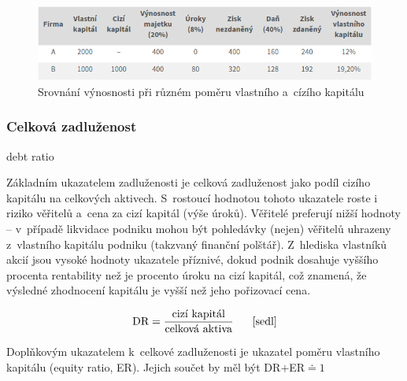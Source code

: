 \begin{figure}
  \centering
  \includegraphics[width=15cm]{img/tab.png}
  \caption{Srovnání výnosnosti při různém poměru vlastního a~cízího kapitálu}
\end{figure}



\subsubsection{Celková zadluženost}
debt ratio

Základním ukazatelem zadluženosti je celková zadluženost jako podíl cizího kapitálu na celkových aktivech. S~rostoucí hodnotou tohoto ukazatele roste i riziko věřitelů a~cena za cizí kapitál (výše úroků). Věřitelé preferují nižší hodnoty -- v~případě likvidace podniku mohou být pohledávky (nejen) věřitelů uhrazeny z~vlastního kapitálu podniku (takzvaný finanční polštář).
Z~hlediska vlastníků akcií jsou vysoké hodnoty ukazatele příznivé, dokud podnik dosahuje vyššího procenta rentability než je procento úroku na cizí kapitál, což znamená, že výsledné zhodnocení kapitálu je vyšší než jeho pořizovací cena.\cite{such}

$$\vz{DR}{cizí kapitál}{celková aktiva} \scite{sedl}$$

\vspace{3mm}
Doplňkovým ukazatelem k~celkové zadluženosti je ukazatel poměru vlastního kapitálu (equity ratio, ER). Jejich součet by měl být DR$+$ER$
\doteq 1$

